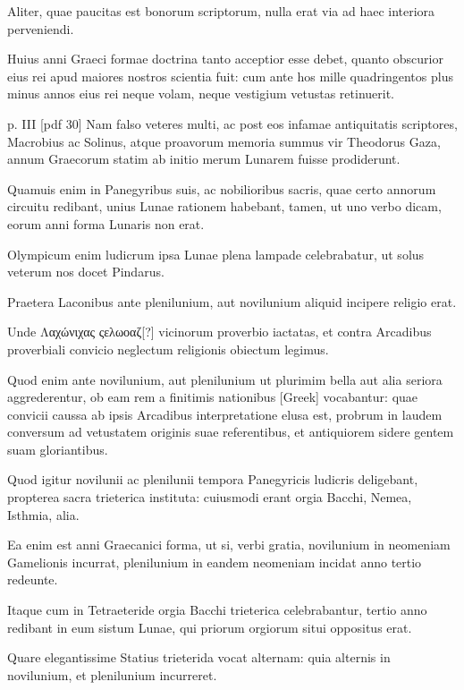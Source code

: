 \begin{parnumbers}
Aliter, quae paucitas est bonorum scriptorum,
nulla erat via ad haec interiora perveniendi.

Huius anni Graeci
formae doctrina tanto acceptior esse debet, quanto obscurior eius
rei apud maiores nostros scientia fuit: cum ante hos mille quadringentos
plus minus annos eius rei neque volam, neque vestigium
vetustas retinuerit.

\clearpage
p. III [pdf 30]
Nam falso veteres multi, ac post eos infamae antiquitatis
scriptores, Macrobius ac Solinus, atque proavorum memoria
summus vir Theodorus Gaza, annum Graecorum statim
ab initio merum Lunarem fuisse prodiderunt.

Quamuis enim in
Panegyribus suis, ac nobilioribus sacris, quae certo annorum circuitu
redibant, unius Lunae rationem habebant, tamen, ut uno verbo
dicam, eorum anni forma Lunaris non erat.

Olympicum enim ludicrum
ipsa Lunae plena lampade celebrabatur, ut solus veterum nos
docet Pindarus. 

Praetera Laconibus ante plenilunium, aut novilunium
aliquid incipere religio erat.

Unde \textgreek{Λαχώνιχας ςελωοαζ}[?] vicinorum
proverbio iactatas, et contra Arcadibus proverbiali convicio
neglectum religionis obiectum legimus. 

Quod enim ante novilunium,
aut plenilunium ut plurimim bella aut alia seriora aggrederentur,
ob eam rem a finitimis nationibus \textgreek{[Greek]} vocabantur:
quae convicii caussa ab ipsis Arcadibus interpretatione elusa est,
probrum in laudem conversum ad vetustatem originis suae referentibus,
et antiquiorem sidere gentem suam gloriantibus. 

Quod igitur
novilunii ac plenilunii tempora Panegyricis ludicris deligebant,
propterea sacra trieterica instituta: cuiusmodi erant orgia Bacchi,
Nemea, Isthmia, alia.

Ea enim est anni Graecanici forma, ut si, verbi
gratia, novilunium in neomeniam Gamelionis incurrat, plenilunium
in eandem neomeniam incidat anno tertio redeunte.

Itaque
cum in Tetraeteride orgia Bacchi trieterica celebrabantur, tertio
anno redibant in eum sistum Lunae, qui priorum orgiorum situi oppositus
erat.

Quare elegantissime Statius trieterida vocat alternam:
quia alternis in novilunium, et plenilunium incurreret.


\end{parnumbers}
